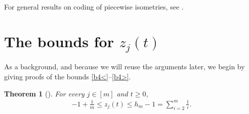 \documentclass[11pt,reqno,tbtags,a4paper]{amsart}
\numberwithin{equation}{section}
\renewcommand\le{\leq}
\renewcommand\ge{\geq}
\renewcommand\leq{\leqslant}
\renewcommand\geq{\geqslant}
\theoremstyle{plain}%
\newtheorem{theorem}{Theorem}[section]
\theoremstyle{definition}
\theoremstyle{remark}
\newcommand\0{{\boldsymbol 0}}
\newcommand\1{{\boldsymbol 1}}
\begin{document}
For general results on coding of piecewise isometries,
see \citet{Goetz}.


\section{The bounds for $z_j(t)$}\label{Sbounds}
As a background, and because we will reuse  the arguments later,
we begin by giving proofs of the bounds \eqref{b4<}--\eqref{b4>}.

\begin{theorem}[\citet{Coppersmith}]\label{T<}
  For every $j\in[m]$ and $t\ge0$,
  \begin{align}\label{t<}
-1+\frac{1}{m}\le    z_j(t) \le h_m-1=\sum_{i=2}^m\frac{1}{i}.
  \end{align}
\end{theorem}
\end{document}
